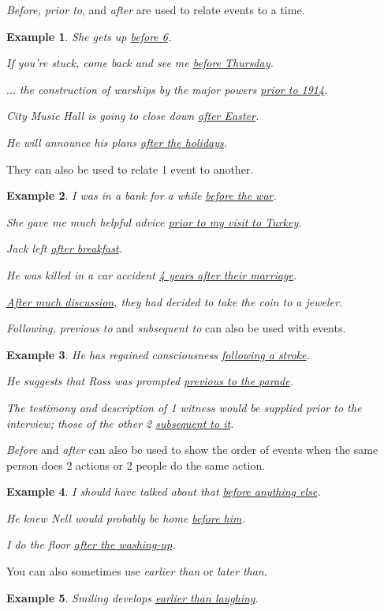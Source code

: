 \documentclass[oneside]{book}
\numberwithin{equation}{section}
\newtheorem{example}{Example}[section]
\begin{document}
%
\textit{Before, prior to}, and \textit{after} are used to relate events to a time.
\begin{example}
    She gets up \underline{before 6}.
    
    If you're stuck, come back and see me \underline{before Thursday}.
    
    $\ldots$ the construction of warships by the major powers \underline{prior to 1914}.
    
    City Music Hall is going to close down \underline{after Easter}.
    
    He will announce his plans \underline{after the holidays}.
\end{example}
They can also be used to relate 1 event to another.
\begin{example}
    I was in a bank for a while \underline{before the war}.
    
    She gave me much helpful advice \underline{prior to my visit to Turkey}.
    
    Jack left \underline{after breakfast}.
    
    He was killed in a car accident \underline{4 years after their marriage}.
    
    \underline{After much discussion}, they had decided to take the coin to a jeweler.
\end{example}
\textit{Following, previous to} and \textit{subsequent to} can also be used with events.
\begin{example}
    He has regained consciousness \underline{following a stroke}.
    
    He suggests that Ross was prompted \underline{previous to the parade}.
    
    The testimony and description of 1 witness would be supplied prior to the interview; those of the other 2 \underline{subsequent to it}.
\end{example}
%
\noindent{} \textit{Before} and \textit{after} can also be used to show the order of events when the same person does 2 actions or 2 people do the same action.
\begin{example}
    I should have talked about that \underline{before anything else}.
    
    He knew Nell would probably be home \underline{before him}.
    
    I do the floor \underline{after the washing-up}.
\end{example}
You can also sometimes use \textit{earlier than} or \textit{later than}.
\begin{example}
    Smiling develops \underline{earlier than laughing}.
\end{example}
\end{document}
